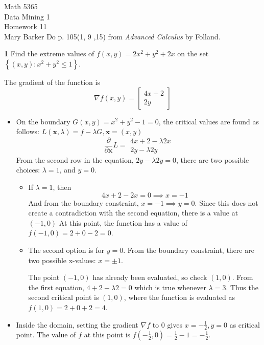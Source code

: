 \documentclass{article}
\begin{document}
\noindent\large{Math 5365}\\
\large{Data Mining 1}\\
\large{Homework 11}\\
\large{Mary Barker}
\doublespace
\newline
\newline
\noindent Do p. 105(1, 9 ,15) from \textit{Advanced Calculus} by Folland. 

\noindent \textbf{1} Find the extreme values of $f(x, y) = 2x^2 + y^2 + 2x$
on the set $\left\{(x, y) : x^2 + y^2 \le 1\right\}$.

The gradient of the function is 
$$\nabla f(x, y) = \begin{bmatrix} 4x + 2 \\ 2y \end{bmatrix}$$
\begin{itemize}
\item 
On the boundary $G(x, y) = x^2 + y^2 - 1 = 0$, the critical values are found as follows: 
$L(\textbf{x}, \lambda) = f - \lambda G, \textbf{x} = (x, y)$
$$
\frac{\partial}{\partial \textbf{x}}L = 
\begin{matrix}
4x + 2 - \lambda 2x \\
2y - \lambda 2y 
\end{matrix}
$$
From the second row in the equation, $2y - \lambda 2y = 0$, there are two possible 
choices: $\lambda = 1$, and $y = 0$. 

\begin{itemize}
\item If $\lambda = 1$, then 
$$4x + 2 - 2x = 0 \implies x = -1$$
And from the boundary constraint, $x = -1 \implies y = 0$. Since this does not 
create a contradiction with the second equation, there is a value at $(-1, 0)$
At this point, the function has a value of $f(-1, 0) = 2 + 0 - 2 = 0$. 

\item The second option is for $y = 0$. From the boundary constraint, there are two 
possible x-values: $x = \pm 1$.

The point $(-1, 0)$ has already been evaluated, so check $(1, 0)$. 
From the first equation, $4 + 2 - \lambda 2 = 0$ which is true whenever 
$\lambda = 3$. Thus the second critical point is $(1, 0)$, where the function 
is evaluated as $f(1, 0) = 2 + 0 + 2 = 4$. 
\end{itemize}

\item 
Inside the domain, setting the gradient $\nabla f$ to $0$ gives $x = -\frac{1}{2}, y = 0$ as 
critical point. The value of $f$ at this point is 
$f(-\frac{1}{2}, 0) = \frac{1}{2} - 1 = -\frac{1}{2}$.
\end{itemize}
\end{document}
